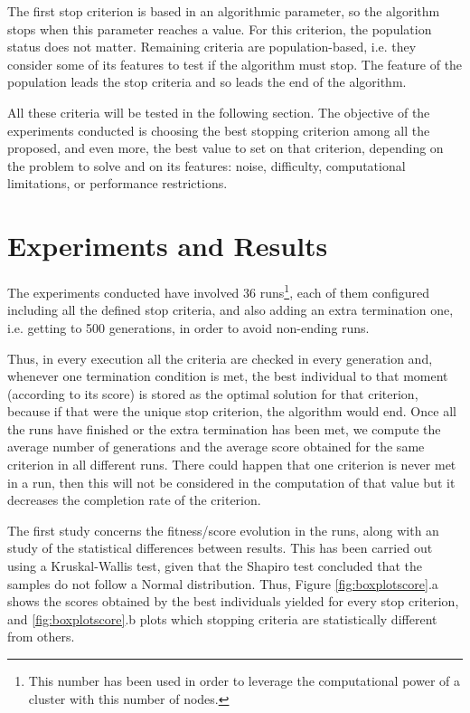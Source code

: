 \documentclass[runningheads,a4paper]{llncs}
\begin{document}
The first stop criterion is based in an algorithmic parameter, so the algorithm stops when this parameter reaches a value. For this criterion, the population status does not matter. Remaining criteria are population-based, i.e. they consider some of its features to test if the algorithm must stop. The feature of the population leads the stop criteria and so leads the end of the algorithm. 

All these criteria will be tested in the following section. The objective of the experiments conducted is choosing the best stopping criterion among all the proposed, and even more, the best value to set on that criterion, depending on the problem to solve and on its features: noise, difficulty, computational limitations, or performance restrictions.


%
%
\section{Experiments and Results}
\label{sec:res}

The experiments conducted have involved 36 runs\footnote{This number has been used in order to leverage the computational power of a cluster with this number of nodes.}, each of them configured including all the defined stop criteria, and also adding an extra termination one, i.e. getting to 500 generations, in order to avoid non-ending runs.

Thus, in every execution all the criteria are checked in every generation and, whenever one termination condition is met, the best individual to that moment (according to its score) is stored as the optimal solution for that criterion, because if that were the unique stop criterion, the algorithm would end.
Once all the runs have finished or the extra termination has been met, we compute the average number of generations and the average score obtained for the same criterion in all different runs. There could happen that one criterion is never met in a run, then this will not be considered in the computation of that value but it decreases the completion rate of the criterion. 

The first study concerns the fitness/score evolution in the runs, along with an study of the statistical differences between results. This has been carried out using a Kruskal-Wallis test, given that the Shapiro test concluded that the samples do not follow a Normal distribution. Thus, Figure \ref{fig:boxplotscore}.a shows the scores obtained by the best individuals yielded for every stop criterion, and \ref{fig:boxplotscore}.b plots which stopping criteria are statistically different from others.
\end{document}
